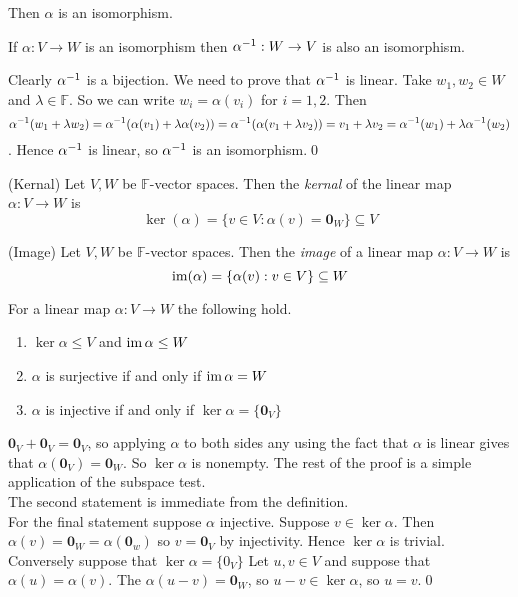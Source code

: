 \documentclass{article}
\newcommand{\F}{\mathbb{F}}
\begin{document}
Then $ \alpha $ is an isomorphism.
\begin{proposition}
  If $ \alpha: V\to W $ is an isomorphism then $ {\alpha}^{-1}:W\to V $ is also an isomorphism.
\end{proposition}
\pf Clearly $ {\alpha}^{-1} $ is a bijection. We need to prove that $ {\alpha}^{-1} $ is linear. Take $ w_1,w_2\in W $ and $ \lambda\in \F $. So we can write $ w_i=\alpha(v_i) $ for $ i=1,2 $. Then \[ {\alpha}^{-1}(w_1+\lambda w_2)={\alpha}^{-1}(\alpha(v_1)+\lambda\alpha(v_2))={\alpha}^{-1}(\alpha(v_1+\lambda v_2))=v_1+\lambda v_2={\alpha}^{-1}(w_1)+\lambda{\alpha}^{-1}(w_2) \]. Hence $ {\alpha}^{-1} $ is linear, so $ {\alpha}^{-1} $ is an isomorphism.\qed 
\begin{definition}
	(Kernal) Let $ V,W $ be $ \F $-vector spaces. Then the \textit{kernal} of the linear map $ \alpha:V\to W $ is
	\[
		\ker(\alpha)=\{v\in V:\alpha(v)=\mathbf 0_W\}\subseteq V
	\]
\end{definition}
\begin{definition}
	(Image) Let $ V,W $ be $ \F $-vector spaces. Then the \textit{image} of a linear map $ \alpha:V\to W $ is
	\[
		\operatorname{im}(\alpha)=\{\alpha(v):v\in V\}\subseteq W
	\]
\end{definition}
\begin{lemma}
  For a linear map $ \alpha:V\to W $ the following hold.
  \begin{enumerate}
	  \item $ \ker\alpha\le V $ and $ \operatorname{im} \alpha \le W $
	  \item $ \alpha $ is surjective if and only if $ \operatorname{im} \alpha =W $
	  \item $ \alpha $ is injective if and only if $ \ker\alpha=\{\mathbf 0_V\} $
  \end{enumerate}
\end{lemma}
\pf $ \mathbf 0_V+\mathbf 0_V=\mathbf 0_V $, so applying $ \alpha $ to both sides any using the fact that $ \alpha $ is linear gives that $ \alpha(\mathbf 0_V)=\mathbf 0_W $. So $ \ker\alpha $ is nonempty. The rest of the proof is a simple application of the subspace test.\\
The second statement is immediate from the definition.\\
For the final statement suppose $ \alpha $ injective. Suppose $ v\in \ker \alpha $. Then $ \alpha(v)=\mathbf 0_W=\alpha(\mathbf 0_w) $ so $ v=\mathbf 0_V $ by injectivity. Hence $ \ker\alpha $ is trivial.
Conversely suppose that $ \ker \alpha=\{0_V\} $ Let $ u,v\in V $ and suppose that $ \alpha(u)=\alpha(v) $. The $ \alpha(u-v)=\mathbf 0_W $, so $ u-v\in\ker\alpha $, so $ u=v $.\qed\par
\end{document}
